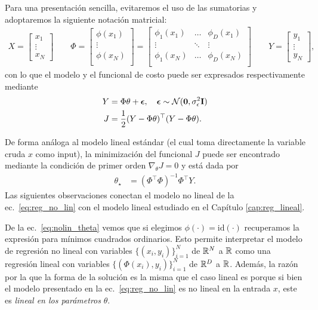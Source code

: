 Para una presentación sencilla, evitaremos el uso de las sumatorias y adoptaremos la siguiente notación matricial:
\begin{align}
    X = \left[ \begin{matrix} x_1 \\ \vdots \\ x_N \end{matrix} \right]\qquad
    \Phi = 
    \left[ \begin{matrix} \phi(x_1)\\
    \vdots \\
    \phi(x_N)\\
    \end{matrix} \right]
     = \left[ \begin{matrix} \phi_1(x_1)& \ldots & \phi_D(x_1)\\
    \vdots & \ddots & \vdots \\
    \phi_1(x_N) & \ldots & \phi_D(x_N)\\
    \end{matrix} \right]
    \qquad
    Y = \left[ \begin{matrix} y_1 \\ \vdots \\ y_N \end{matrix} \right],
\end{align}
con lo que el modelo y el funcional de costo puede ser expresados respectivamente mediante
\begin{align}
    Y &= \Phi\theta + {\bm \epsilon},\quad {\bm \epsilon}\sim{\mathcal N}(\mathbf{0},\sigma_\epsilon^2\mathbf{I})\\
    J &= \frac{1}{2} (Y-\Phi\theta)^\top(Y-\Phi\theta).
\end{align}

De forma análoga al modelo lineal estándar (el cual toma directamente la variable cruda $x$ como input), la minimización del funcional $J$ puede  ser encontrado mediante la condición de primer orden $\nabla_\theta J=0$ y está dada por 
\begin{align}
    \theta_{\star}&= (\Phi^\top\Phi)^{-1}\Phi^\top Y\label{eq:nolin_theta}.
\end{align}
Las siguientes observaciones conectan el modelo no lineal de la ec.~\eqref{eq:reg_no_lin} con el modelo lineal estudiado en el Capítulo \ref{cap:reg_lineal}.


\begin{remark}
De la ec.~\eqref{eq:nolin_theta} vemos que si elegimos $\phi(\cdot) = \text{id}(\cdot)$ recuperamos la expresión para mínimos cuadrados ordinarios. Esto permite interpretar el modelo de regresión no lineal con variables $\{(x_i,y_i)\}_{i=1}^N$ de ${\mathbb R}^N$ a ${\mathbb R}$ como una regresión lineal con variables $\{(\Phi(x_i),y_i)\}_{i=1}^N$ de ${\mathbb R}^D$ a ${\mathbb R}$. Además, la razón por la que la forma de la solución es la misma que el caso lineal es porque si bien el modelo presentado en la ec.~\eqref{eq:reg_no_lin} es no  lineal en la entrada $x$, este es \emph{lineal en los parámetros} $\theta$.
\end{remark}


